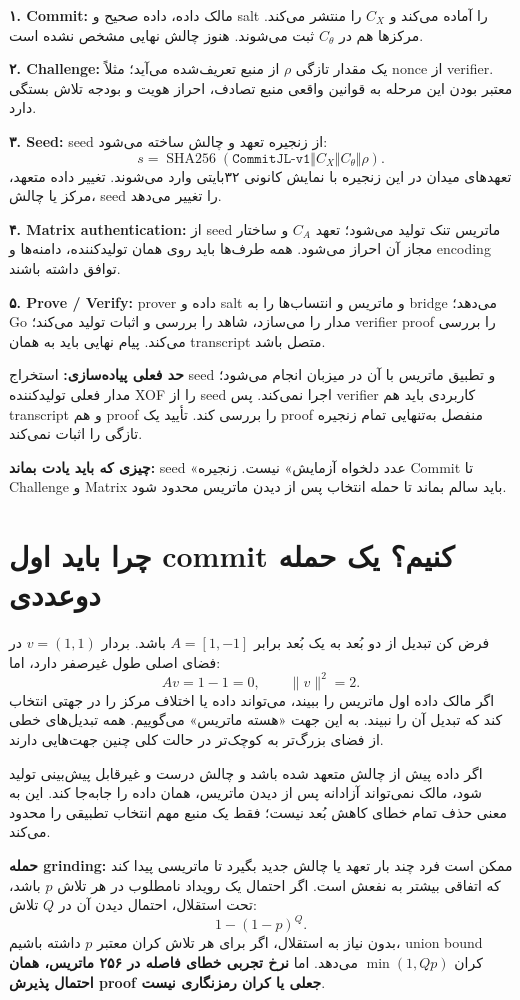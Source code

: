 \documentclass[11pt,a4paper]{article}
\newcommand{\lesson}[1]{\clearpage\section{#1}}
\newcommand{\takeaway}[1]{\par\textbf{چیزی که باید یادت بماند:} #1\par}
\begin{document}
\textbf{۱. Commit:} مالک داده، داده صحیح و salt را آماده می‌کند و \(C_X\) را منتشر می‌کند. مرکزها هم در \(C_\theta\) ثبت می‌شوند. هنوز چالش نهایی مشخص نشده است.

\textbf{۲. Challenge:} یک مقدار تازگی \(\rho\) از منبع تعریف‌شده می‌آید؛ مثلاً nonce از verifier. معتبر بودن این مرحله به قوانین واقعی منبع تصادف، احراز هویت و بودجه تلاش بستگی دارد.

\textbf{۳. Seed:} seed از زنجیره تعهد و چالش ساخته می‌شود:
\[
 s=\operatorname{SHA256}(\texttt{CommitJL-v1}\Vert C_X\Vert C_\theta\Vert\rho).
\]
تعهدهای میدان در این زنجیره با نمایش کانونی ۳۲بایتی وارد می‌شوند. تغییر داده متعهد، مرکز یا چالش، seed را تغییر می‌دهد.

\textbf{۴. Matrix authentication:} از seed ماتریس تنک تولید می‌شود؛ تعهد \(C_A\) و ساختار مجاز آن احراز می‌شود. همه طرف‌ها باید روی همان تولیدکننده، دامنه‌ها و encoding توافق داشته باشند.

\textbf{۵. Prove / Verify:} prover داده و salt و ماتریس و انتساب‌ها را به bridge می‌دهد؛ Go مدار را می‌سازد، شاهد را بررسی و اثبات تولید می‌کند؛ verifier proof را بررسی می‌کند. پیام نهایی باید به همان transcript متصل باشد.

\textbf{حد فعلی پیاده‌سازی:} استخراج seed و تطبیق ماتریس با آن در میزبان انجام می‌شود؛ مدار فعلی تولیدکننده XOF را از seed اجرا نمی‌کند. پس verifier کاربردی باید هم transcript و هم proof را بررسی کند. تأیید یک proof منفصل به‌تنهایی تمام زنجیره تازگی را اثبات نمی‌کند.

\takeaway{seed «عدد دلخواه آزمایش» نیست. زنجیره Commit تا Challenge و Matrix باید سالم بماند تا حمله انتخاب پس از دیدن ماتریس محدود شود.}

\lesson{چرا باید اول commit کنیم؟ یک حمله دوعددی}
فرض کن تبدیل از دو بُعد به یک بُعد برابر \(A=[1,-1]\) باشد. بردار \(v=(1,1)\) در فضای اصلی طول غیرصفر دارد، اما:
\[
 Av=1-1=0,\qquad \|v\|^2=2.
\]
اگر مالک داده اول ماتریس را ببیند، می‌تواند داده یا اختلاف مرکز را در جهتی انتخاب کند که تبدیل آن را نبیند. به این جهت «هسته ماتریس» می‌گوییم. همه تبدیل‌های خطی از فضای بزرگ‌تر به کوچک‌تر در حالت کلی چنین جهت‌هایی دارند.

اگر داده پیش از چالش متعهد شده باشد و چالش درست و غیرقابل پیش‌بینی تولید شود، مالک نمی‌تواند آزادانه پس از دیدن ماتریس، همان داده را جابه‌جا کند. این به معنی حذف تمام خطای کاهش بُعد نیست؛ فقط یک منبع مهم انتخاب تطبیقی را محدود می‌کند.

\textbf{حمله grinding:} ممکن است فرد چند بار تعهد یا چالش جدید بگیرد تا ماتریسی پیدا کند که اتفاقی بیشتر به نفعش است. اگر احتمال یک رویداد نامطلوب در هر تلاش \(p\) باشد، تحت استقلال، احتمال دیدن آن در \(Q\) تلاش:
\[
 1-(1-p)^Q.
\]
بدون نیاز به استقلال، اگر برای هر تلاش کران معتبر \(p\) داشته باشیم، union bound کران \(\min(1,Qp)\) می‌دهد. اما \textbf{نرخ تجربی خطای فاصله در ۲۵۶ ماتریس، همان احتمال پذیرش proof جعلی یا کران رمزنگاری نیست}.
\end{document}
